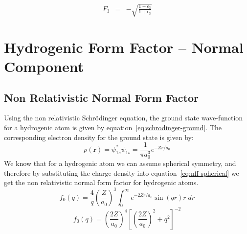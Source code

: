 \documentclass[a4paper,titlepage]{report}
\newcommand{\mb}[1]{\mathbf{#1}}
\begin{document}
\begin{eqnarray*}
	F_3 & = &  -\sqrt{
					\frac{1 - \epsilon_3}{1 + \epsilon_3}
				}
\end{eqnarray*}


\section{Hydrogenic Form Factor -- Normal Component}
	\subsection{Non Relativistic Normal Form Factor}
	Using the non relativistic Schr\"odinger equation, the ground state
	wave-function for a hydrogenic atom is given by
	equation~\ref{eq:schrodinger-ground}.
	The corresponding electron density for the ground state is given by:
	\begin{equation}
		\rho(\mb{r}) = \psi_{1s}^{*} \psi_{1s} 
					 = \frac{1}{\pi a_{0}^{3}} e^{-Zr/a_0}
	\end{equation}
	We know that for a hydrogenic atom we can assume spherical symmetry,
	and therefore by substituting the charge density into
	equation~\ref{eq:nff-spherical} we get the non relativistic normal 
	form factor for hydrogenic atoms.
	\begin{equation*}
		f_0(q) = \frac{4}{q} \left( \frac{Z}{a_0} \right)^3
				 \int_0^\infty e^{-2Zr/a_0} \sin(qr) r \; dr
	\end{equation*}
	\begin{equation}
		\boxed{
			f_0(q) = \left( \frac{2Z}{a_0} \right)^4 
			     	 \left[ \left( \frac{2Z}{a_0} \right)^2 + q^2 \right]^{-2} 
		}
	\end{equation}
\end{document}
